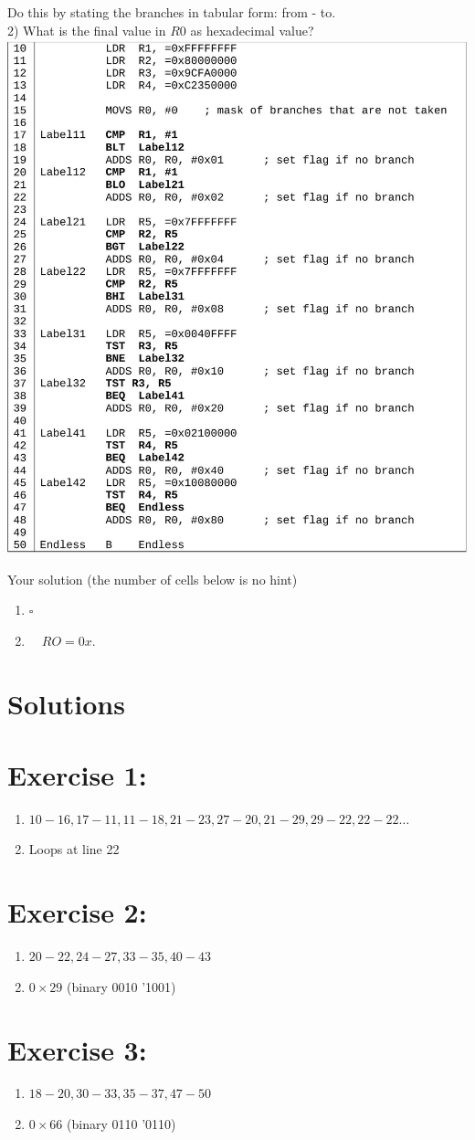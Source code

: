 \documentclass[10pt]{article}
\begin{document}
Do this by stating the branches in tabular form: from - to.\\
2) What is the final value in $R 0$ as hexadecimal value?\\
\includegraphics[max width=\textwidth, center]{2025_01_02_9902c2d2685de638ef73g-4}

Your solution (the number of cells below is no hint)

\begin{enumerate}
  \item $\square$
  \item $\quad R O=0 x$. $\qquad$
\end{enumerate}

\section*{Solutions}
\section*{Exercise 1:}
\begin{enumerate}
  \item $10-16,17-11,11-18,21-23,27-20,21-29,29-22,22-22 \ldots$
  \item Loops at line 22
\end{enumerate}

\section*{Exercise 2:}
\begin{enumerate}
  \item $20-22,24-27,33-35,40-43$
  \item $0 \times 29$ (binary 0010 '1001)
\end{enumerate}

\section*{Exercise 3:}
\begin{enumerate}
  \item $18-20,30-33,35-37,47-50$
  \item $0 \times 66$ (binary 0110 '0110)
\end{enumerate}
\end{document}
